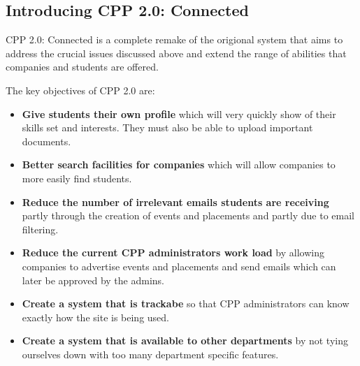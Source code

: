 \subsection{Introducing CPP 2.0: Connected}
CPP 2.0: Connected is a complete remake of the origional system that aims to address the crucial issues discussed above and extend the range of abilities that companies and students are offered.

The key objectives of CPP 2.0 are:
\begin{itemize}
  \item \textbf{Give students their own profile} which will very quickly show of their skills set and interests. They must also be able to upload important documents.
  \item \textbf{Better search facilities for companies} which will allow companies to more easily find students.
  \item \textbf{Reduce the number of irrelevant emails students are receiving} partly through the creation of events and placements and partly due to email filtering.
  \item \textbf{Reduce the current CPP administrators work load} by allowing companies to advertise events and placements and send emails which can later be approved by the admins.
  \item \textbf{Create a system that is trackabe} so that CPP administrators can know exactly how the site is being used.
  \item \textbf{Create a system that is available to other departments} by not tying ourselves down with too many department specific features.
\end{itemize}